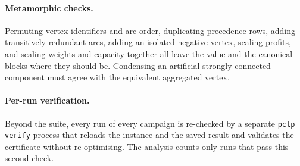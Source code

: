 \paragraph{Metamorphic checks.} Permuting vertex identifiers and arc order,
duplicating precedence rows, adding transitively redundant arcs, adding an
isolated negative vertex, scaling profits, and scaling weights and capacity
together all leave the value and the canonical blocks where they should be.
Condensing an artificial strongly connected component must agree with the
equivalent aggregated vertex.

\paragraph{Per-run verification.} Beyond the suite, every run of every campaign
is re-checked by a separate \texttt{pclp verify} process that reloads the
instance and the saved result and validates the certificate without
re-optimising. The analysis counts only runs that pass this second check.
